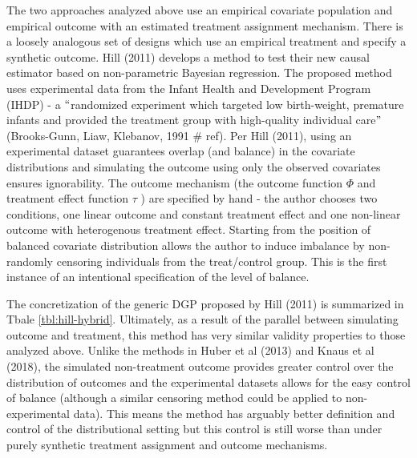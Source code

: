 \documentclass[../main.tex]{subfiles}
\begin{document}
\vspace{\baselineskip}
The two approaches analyzed above use an empirical covariate population and empirical outcome with an estimated treatment assignment mechanism. There is a loosely analogous set of designs which use an empirical treatment and specify a synthetic outcome. Hill (2011) develops a method to test their new causal estimator based on non-parametric Bayesian regression. The proposed method uses experimental data from the Infant Health and Development Program (IHDP) - a $``$randomized experiment which targeted low birth-weight, premature infants and provided the treatment group with high-quality individual care$"$  (Brooks-Gunn, Liaw, Klebanov, 1991 $\#$ ref). Per Hill (2011), using an experimental dataset guarantees overlap (and balance) in the covariate distributions and simulating the outcome using only the observed covariates ensures ignorability. The outcome mechanism (the outcome function  \(  \Phi  \) and treatment effect function  \(  \tau \) ) are specified by hand - the author chooses two conditions, one linear outcome and constant treatment effect and one non-linear outcome with heterogenous treatment effect. Starting from the position of balanced covariate distribution allows the author to induce imbalance by non-randomly censoring individuals from the treat/control group. This is the first instance of an intentional specification of the level of balance.\par


\vspace{\baselineskip}
The concretization of the generic DGP proposed by Hill (2011) is summarized in Tbale \ref{tbl:hill-hybrid}. Ultimately, as a result of the parallel between simulating outcome and treatment, this method has very similar validity properties to those analyzed above. Unlike the methods in Huber et al (2013) and Knaus et al (2018), the simulated non-treatment outcome provides greater control over the distribution of outcomes and the experimental datasets allows for the easy control of balance (although a similar censoring method could be applied to non-experimental data). This means the method has arguably better definition and control of the distributional setting but this control is still worse than under purely synthetic treatment assignment and outcome mechanisms.\par
\end{document}
